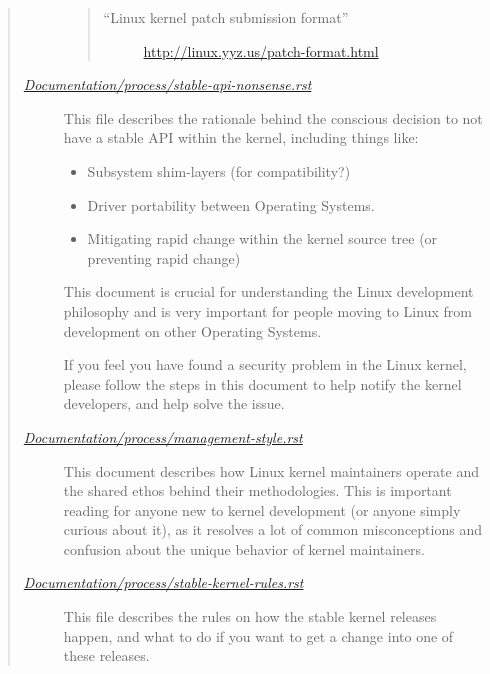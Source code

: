 \documentclass[a4paper,8pt,english]{sphinxmanual}
\begin{document}
\begin{quote}
\begin{description}
\begin{quote}
\begin{description}
\item[{``Linux kernel patch submission format''}] \leavevmode
\href{http://linux.yyz.us/patch-format.html}{http://linux.yyz.us/patch-format.html}

\end{description}
\end{quote}

\item[{{\hyperref[process/stable\string-api\string-nonsense:stable\string-api\string-nonsense]{\emph{Documentation/process/stable-api-nonsense.rst}}}}] \leavevmode
This file describes the rationale behind the conscious decision to
not have a stable API within the kernel, including things like:
\begin{itemize}
\item {} 
Subsystem shim-layers (for compatibility?)

\item {} 
Driver portability between Operating Systems.

\item {} 
Mitigating rapid change within the kernel source tree (or
preventing rapid change)

\end{itemize}

This document is crucial for understanding the Linux development
philosophy and is very important for people moving to Linux from
development on other Operating Systems.

\item[{\DUspan{xref,std,std-ref}{Documentation/admin-guide/security-bugs.rst}}] \leavevmode
If you feel you have found a security problem in the Linux kernel,
please follow the steps in this document to help notify the kernel
developers, and help solve the issue.

\item[{{\hyperref[process/management\string-style:managementstyle]{\emph{Documentation/process/management-style.rst}}}}] \leavevmode
This document describes how Linux kernel maintainers operate and the
shared ethos behind their methodologies.  This is important reading
for anyone new to kernel development (or anyone simply curious about
it), as it resolves a lot of common misconceptions and confusion
about the unique behavior of kernel maintainers.

\item[{{\hyperref[process/stable\string-kernel\string-rules:stable\string-kernel\string-rules]{\emph{Documentation/process/stable-kernel-rules.rst}}}}] \leavevmode
This file describes the rules on how the stable kernel releases
happen, and what to do if you want to get a change into one of these
releases.


\end{description}
\end{quote}
\end{document}
